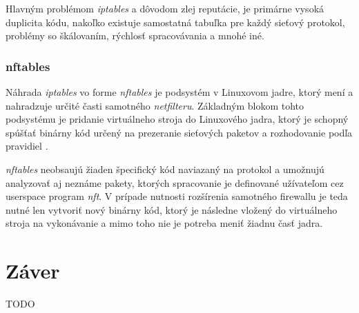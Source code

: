 Hlavným problémom \emph{iptables} a dôvodom zlej reputácie, je primárne vysoká duplicita kódu, nakoľko existuje samostatná tabuľka pre každý sieťový protokol, problémy so škálovaním, rýchlosť spracovávania a mnohé iné.

\subsection{nftables}
Náhrada \emph{iptables} vo forme \emph{nftables} je podsystém v Linuxovom jadre, ktorý mení a nahradzuje určité časti samotného \emph{netfilteru}. Základným blokom tohto podsystému je pridanie virtuálneho stroja do Linuxového jadra, ktorý je schopný spúšťať binárny kód určený na prezeranie sieťových paketov a rozhodovanie podľa pravidiel \cite{manpages, netfilter}. 

                                                                                 
\emph{nftables} neobsaujú žiaden špecifický kód naviazaný na protokol a umožnujú analyzovať aj neznáme pakety, ktorých spracovanie je definované užívateľom cez userspace program \emph{nft}. V prípade nutnosti rozšírenia samotného firewallu je teda nutné len vytvoriť nový binárny kód, ktorý je následne vložený do virtuálneho stroja na vykonávanie a mimo toho nie je potreba meniť žiadnu časť jadra.



\chapter{Záver}
TODO
